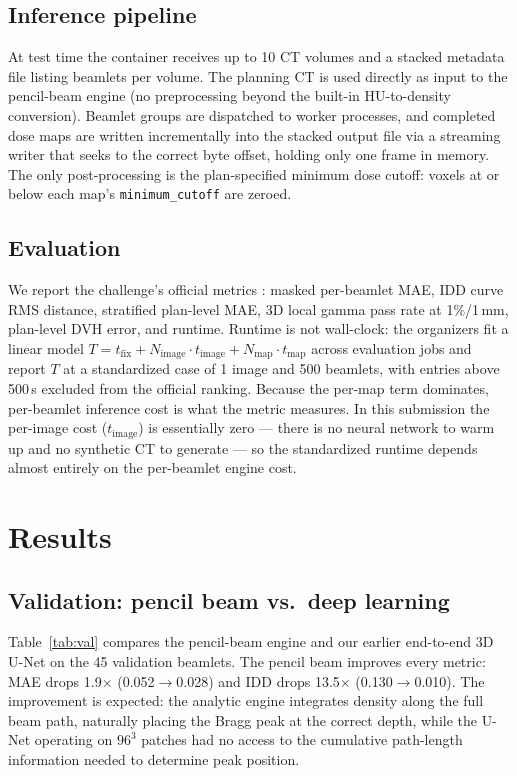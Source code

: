 \documentclass[runningheads]{llncs}
\begin{document}
\subsection{Inference pipeline}
At test time the container receives up to 10 CT volumes and a stacked metadata file listing beamlets per volume. The planning CT is used directly as input to the pencil-beam engine (no preprocessing beyond the built-in HU-to-density conversion). Beamlet groups are dispatched to worker processes, and completed dose maps are written incrementally into the stacked output file via a streaming writer that seeks to the correct byte offset, holding only one frame in memory. The only post-processing is the plan-specified minimum dose cutoff: voxels at or below each map's \texttt{minimum\_cutoff} are zeroed.

\subsection{Evaluation}
We report the challenge's official metrics \cite{doserad_metrics}: masked per-beamlet MAE, IDD curve RMS distance, stratified plan-level MAE, 3D local gamma pass rate at 1\%/1\,mm, plan-level DVH error, and runtime. Runtime is not wall-clock: the organizers fit a linear model $T = t_{\mathrm{fix}} + N_{\mathrm{image}} \cdot t_{\mathrm{image}} + N_{\mathrm{map}} \cdot t_{\mathrm{map}}$ across evaluation jobs and report $T$ at a standardized case of 1 image and 500 beamlets, with entries above 500\,s excluded from the official ranking. Because the per-map term dominates, per-beamlet inference cost is what the metric measures. In this submission the per-image cost ($t_{\mathrm{image}}$) is essentially zero --- there is no neural network to warm up and no synthetic CT to generate --- so the standardized runtime depends almost entirely on the per-beamlet engine cost.

\section{Results}

\subsection{Validation: pencil beam vs.\ deep learning}
Table~\ref{tab:val} compares the pencil-beam engine and our earlier end-to-end 3D U-Net on the 45 validation beamlets. The pencil beam improves every metric: MAE drops 1.9$\times$ (0.052$\rightarrow$0.028) and IDD drops 13.5$\times$ (0.130$\rightarrow$0.010). The improvement is expected: the analytic engine integrates density along the full beam path, naturally placing the Bragg peak at the correct depth, while the U-Net operating on $96^3$ patches had no access to the cumulative path-length information needed to determine peak position.
\end{document}
